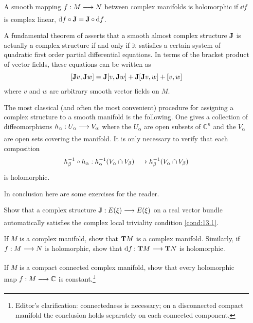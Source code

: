 \documentclass[../main]{subfiles}
\begin{document}
\begin{definition}
A smooth mapping $f:M\varrightarrow{} N$ between complex manifolds is holomorphic if $\dd{f}$ is complex linear, $\mathrm{d} f \circ \mathbf{J} = \mathbf{J} \circ \mathrm{d} f$.
\end{definition}

\begin{remark}
A fundamental theorem of \cite{newlander} asserts that a smooth almost complex structure $\mathbf{J}$ is actually a complex structure if and only if it satisfies a certain system of quadratic first order partial differential equations. In terms of the bracket product of vector fields, these equations can be written as
\[[\mathbf{J} v, \mathbf{J} w]= \mathbf{J}[v,\mathbf{J} w]+\mathbf{J}[\mathbf{J} v,w]+[v,w]\]
where $v$ and $w$ are arbitrary smooth vector fields on $M$.
\end{remark}
The most classical (and often the most convenient) procedure for
assigning a complex structure to a smooth manifold is the following. One gives a collection of diffeomorphisms $h_\alpha:U_\alpha\varrightarrow{}V_\alpha$ where the $U_\alpha$ are open subsets of $\mathbb{C}^n$ and the $V_\alpha$ are open sets covering the manifold. It is only necessary to verify that each composition
\[h_\beta^{-1} \circ h_\alpha: h_\alpha^{-1}(V_\alpha\cap V_\beta)\varrightarrow{} h_\beta^{-1}(V_\alpha\cap V_\beta)\]
is holomorphic.

In conclusion here are some exercises for the reader.

\begin{problem}
\label{prob:13.A} Show that a complex structure $\complexstructure: E(\xi)\varrightarrow{} E(\xi)$ on a real vector bundle automatically satisfies the complex local triviality condition \ref{cond:13.1}.
\end{problem}

\begin{problem}
\label{prob:13.B} If $M$ is a complex manifold, show that $\mathbf{T}M$ is a complex manifold. Similarly, if $f:M\varrightarrow{}N$ is holomorphic, show that $\differential{f}{}:\tangentTS{M}\varrightarrow{}\tangentTS{N}$ is holomorphic.
\end{problem}

\begin{problem}
\label{prob:13.C} If $M$ is a compact connected complex manifold, show that every holomorphic map $f:M\varrightarrow{}\mathbb{C}$ is constant.\footnote{Editor's clarification: connectedness is necessary; on a disconnected compact manifold the conclusion holds separately on each connected component.}
\end{problem}
\end{document}
